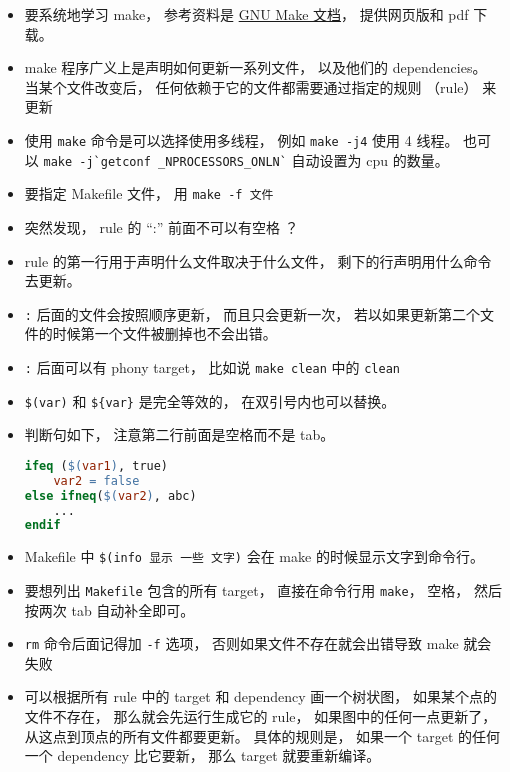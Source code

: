 


\begin{itemize}
\item 要系统地学习 make， 参考资料是 \href{https://www.gnu.org/software/make/manual/}{GNU Make 文档}， 提供网页版和 pdf 下载。
\item make 程序广义上是声明如何更新一系列文件， 以及他们的 dependencies。 当某个文件改变后， 任何依赖于它的文件都需要通过指定的规则 （rule） 来更新
\item 使用 \verb|make| 命令是可以选择使用多线程， 例如 \verb|make -j4| 使用 4 线程。 也可以 \verb|make -j`getconf _NPROCESSORS_ONLN`| 自动设置为 cpu 的数量。
\item 要指定 Makefile 文件， 用 \verb|make -f 文件|
\item 突然发现， rule 的 “:” 前面不可以有空格 ？
\item rule 的第一行用于声明什么文件取决于什么文件， 剩下的行声明用什么命令去更新。
\item \verb|:| 后面的文件会按照顺序更新， 而且只会更新一次， 若以如果更新第二个文件的时候第一个文件被删掉也不会出错。
\item \verb|:| 后面可以有 phony target， 比如说 \verb|make clean| 中的 \verb|clean|
\item \verb|$(var)| 和 \verb|${var}| 是完全等效的， 在双引号内也可以替换。
\item 判断句如下， 注意第二行前面是空格而不是 tab。
\begin{lstlisting}[language=makefile]
ifeq ($(var1), true)
    var2 = false
else ifneq($(var2), abc)
    ...
endif
\end{lstlisting}
\item Makefile 中 \verb|$(info 显示 一些 文字)| 会在 make 的时候显示文字到命令行。
\item 要想列出 \verb|Makefile| 包含的所有 target， 直接在命令行用 \verb|make|， 空格， 然后按两次 tab 自动补全即可。
\item \verb|rm| 命令后面记得加 \verb|-f| 选项， 否则如果文件不存在就会出错导致 make 就会失败
\item 可以根据所有 rule 中的 target 和 dependency 画一个树状图， 如果某个点的文件不存在， 那么就会先运行生成它的 rule， 如果图中的任何一点更新了， 从这点到顶点的所有文件都要更新。 具体的规则是， 如果一个 target 的任何一个 dependency 比它要新， 那么 target 就要重新编译。

\end{itemize}
